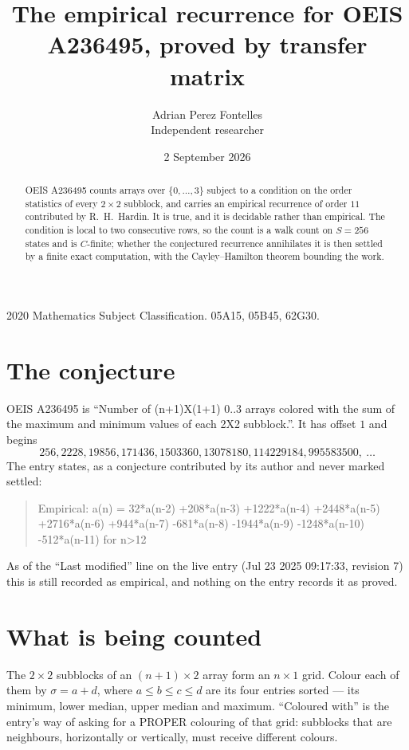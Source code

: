 \documentclass[11pt,a4paper]{article}
\title{The empirical recurrence for OEIS A236495, proved by transfer matrix}
\author{Adrian Perez Fontelles\\ \small Independent researcher}
\date{2 September 2026}
\theoremstyle{plain}
\theoremstyle{definition}
\begin{document}
\maketitle

\begin{abstract}
OEIS A236495 counts arrays over $\{0,\dots,3\}$ subject to a condition on the order
statistics of every $2\times2$ subblock, and carries an empirical recurrence of order
$11$ contributed by R.~H.~Hardin. It is true, and it is decidable rather than empirical.
The condition is local to two consecutive rows, so the count is a walk count on $S=256$
states and is $C$-finite; whether the conjectured recurrence annihilates it is then settled by
a finite exact computation, with the Cayley--Hamilton theorem bounding the work.
\end{abstract}

\noindent\small 2020 Mathematics Subject Classification. 05A15, 05B45, 62G30.\normalsize

\section{The conjecture}

OEIS A236495 is ``Number of (n+1)X(1+1) 0..3 arrays colored with the sum of the maximum and minimum values of each 2X2 subblock.''. It has offset $1$ and begins
\[
256, 2228, 19856, 171436, 1503360, 13078180, 114229184, 995583500,\ \dots
\]
The entry states, as a conjecture contributed by its author and never marked settled:
\begin{quote}
Empirical: a(n) = 32*a(n-2) +208*a(n-3) +1222*a(n-4) +2448*a(n-5) +2716*a(n-6) +944*a(n-7) -681*a(n-8) -1944*a(n-9) -1248*a(n-10) -512*a(n-11) for n>12
\end{quote}
As of the ``Last modified'' line on the live entry (Jul 23 2025 09:17:33, revision 7) this is still
recorded as empirical, and nothing on the entry records it as proved.

\section{What is being counted}

The $2\times2$ subblocks of an $(n+1)\times2$ array form an
$n\times1$ grid. Colour each of them by $\sigma=a+d$, where $a\le b\le c\le d$ are its four entries sorted --- its minimum, lower median, upper median and maximum. ``Coloured with'' is the entry's way of
asking for a PROPER colouring of that grid: subblocks that are neighbours, horizontally or
vertically, must receive different colours.
\end{document}
